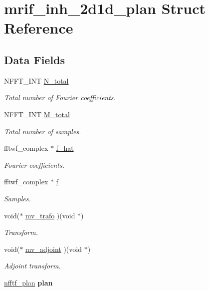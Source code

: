 \hypertarget{structmrif__inh__2d1d__plan}{\section{mrif\-\_\-inh\-\_\-2d1d\-\_\-plan Struct Reference}
\label{structmrif__inh__2d1d__plan}
}
\subsection*{Data Fields}
\begin{DoxyCompactItemize}
\item 
N\-F\-F\-T\-\_\-\-I\-N\-T \hyperlink{structmrif__inh__2d1d__plan_a7846a173c42c9b65d4e93a16da121ff4}{N\-\_\-total}
\begin{DoxyCompactList}\small\item\em Total number of Fourier coefficients. \end{DoxyCompactList}\item 
N\-F\-F\-T\-\_\-\-I\-N\-T \hyperlink{structmrif__inh__2d1d__plan_aa88bdba25fa7c21f526b91ae6cb4b84e}{M\-\_\-total}
\begin{DoxyCompactList}\small\item\em Total number of samples. \end{DoxyCompactList}\item 
fftwf\-\_\-complex $\ast$ \hyperlink{structmrif__inh__2d1d__plan_a18fb340e9ead654552e45033c81ac637}{f\-\_\-hat}
\begin{DoxyCompactList}\small\item\em Fourier coefficients. \end{DoxyCompactList}\item 
fftwf\-\_\-complex $\ast$ \hyperlink{structmrif__inh__2d1d__plan_a3ab01f8b5f1b1368dbf3d7715ce46997}{f}
\begin{DoxyCompactList}\small\item\em Samples. \end{DoxyCompactList}\item 
void($\ast$ \hyperlink{structmrif__inh__2d1d__plan_acdbe3a414d9c87baba03db3d873b864c}{mv\-\_\-trafo} )(void $\ast$)
\begin{DoxyCompactList}\small\item\em Transform. \end{DoxyCompactList}\item 
void($\ast$ \hyperlink{structmrif__inh__2d1d__plan_aea23a3331d423e70f2cbbeee71303906}{mv\-\_\-adjoint} )(void $\ast$)
\begin{DoxyCompactList}\small\item\em Adjoint transform. \end{DoxyCompactList}\item 
\hypertarget{structmrif__inh__2d1d__plan_a50fc144d7931e8db51c8b745096419c0}{\hyperlink{structnfftf__plan}{nfftf\-\_\-plan} {\bfseries plan}}\label{structmrif__inh__2d1d__plan_a50fc144d7931e8db51c8b745096419c0}


\end{DoxyCompactItemize}
